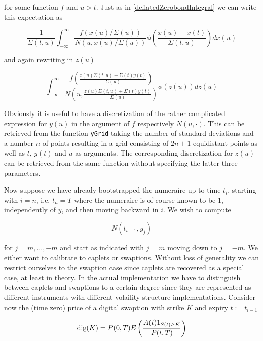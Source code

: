 \documentclass{amsart}
\theoremstyle{plain}
\numberwithin{equation}{section}
\begin{document}
for some function $f$ and $u>t$. Just as in \ref{deflatedZerobondIntegral} we can write this expectation as

\begin{equation}\label{deflatedZerobondIntegral2}
\frac{1}{\Sigma(t,u)} \int_{-\infty}^{\infty} \frac{f(x(u)/\Sigma(u))}{N(u,x(u)/\Sigma(u))} \phi\left( \frac{x(u) - x(t)}{\Sigma(t,u)}\right) dx(u)
\end{equation}

and again rewriting in $z(u)$

\begin{equation}\label{ygrid}
\int_{-\infty}^{\infty} \frac{f\left(\frac{z(u)\Sigma(t,u)+\Sigma(t)y(t)}{\Sigma(u)}\right) }{N \left(u, \frac{z(u)\Sigma(t,u)+\Sigma(t)y(t)}{\Sigma(u)} \right)}\phi(z(u)) dz(u)
\end{equation}

Obviously it is useful to have a discretization of the rather complicated expression for $y(u)$ in the argument of $f$ respectively $N(u,\cdot)$. This can be retrieved from the function \verb+yGrid+ taking the number of standard deviations and a number $n$ of points resulting in a grid consisting of $2n+1$   equidistant points as well as $t$, $y(t)$ and $u$ as arguments. The corresponding discretization for $z(u)$ can be retrieved from the same function without specifying  the latter three parameters.

Now suppose we have already bootstrapped the numeraire up to time $t_i$, starting with $i=n$, i.e. $t_n = T$  where the numeraire is of course known to be $1$, independently of $y$, and then moving backward in $i$. We wish to compute

\begin{equation}
N(t_{i-1},y_j)
\end{equation}

for $j=m,...,-m$ and start as indicated with $j=m$ moving down to $j=-m$. We either want to calibrate to caplets or swaptions. Without loss of generality we
can restrict ourselves to the swaption case since caplets are recovered as a special case, at least in theory. In the actual implementation we have to distinguish
between caplets and swaptions to a certain degree since they are represented as different instruments with different volaility structure implementations. Consider now the (time zero) price of a digital swaption with strike $K$ and expiry $t:=t_{i-1}$

\begin{equation}
\textnormal{dig}(K) = P(0,T) E\left(\frac{ A(t) 1_{S(t)\geq K}}{P(t,T)} \right)
\end{equation}
\end{document}
